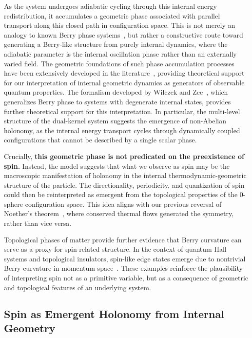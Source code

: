 \documentclass[%
 reprint,
 amsmath,amssymb,
 aps,
]{revtex4-1}
\numberwithin{equation}{section}%
\begin{document}
As the system undergoes adiabatic cycling through this internal energy redistribution, it accumulates a geometric phase associated with parallel transport along this closed path in configuration space. This is not merely an analogy to known Berry phase systems~\cite{berry1984quantal}, but rather a constructive route toward generating a Berry-like structure from purely internal dynamics, where the adiabatic parameter is the internal oscillation phase rather than an externally varied field. The geometric foundations of such phase accumulation processes have been extensively developed in the literature~\cite{shapere1989geometric}, providing theoretical support for our interpretation of internal geometric dynamics as generators of observable quantum properties. The formalism developed by Wilczek and Zee~\cite{wilczek1984appearance}, which generalizes Berry phase to systems with degenerate internal states, provides further theoretical support for this interpretation. In particular, the multi-level structure of the dual-kernel system suggests the emergence of non-Abelian holonomy, as the internal energy transport cycles through dynamically coupled configurations that cannot be described by a single scalar phase.

Crucially, \textbf{this geometric phase is not predicated on the preexistence of spin.} Instead, the model suggests that what we observe as spin may be the macroscopic manifestation of holonomy in the internal thermodynamic-geometric structure of the particle. The directionality, periodicity, and quantization of spin could then be reinterpreted as emergent from the topological properties of the 0-sphere configuration space. This idea aligns with our previous reversal of Noether's theorem~\cite{hanamura2506.0119}, where conserved thermal flows generated the symmetry, rather than vice versa.

Topological phases of matter provide further evidence that Berry curvature can serve as a proxy for spin-related structure. In the context of quantum Hall systems and topological insulators, spin-like edge states emerge due to nontrivial Berry curvature in momentum space~\cite{hasan2010colloquium}. These examples reinforce the plausibility of interpreting spin not as a primitive variable, but as a consequence of geometric and topological features of an underlying system.

\subsection{Spin as Emergent Holonomy from Internal Geometry} \label{subsec:emergent_spin_holonomy}
\end{document}
